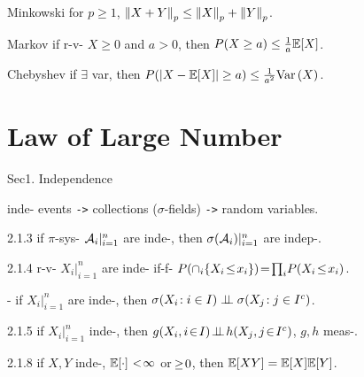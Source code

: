 \begin{thm}{Minkowski}
    for $p \geq 1$, $\norm{p}{X+Y} \leq \norm{p}{X} + \norm{p}{Y}$.
\end{thm}

\begin{thm}{Markov}
    if r-v- $X \geq 0$ and $a > 0$, then $\prob{ X \geq a} \leq \frac{1}{a}\bE{X}$.
\end{thm}

\begin{thm}{Chebyshev}
    if $\exists$ var, then $\prob{\abs{X-\bE{X}} \geq a} \leq \frac{1}{a^2} \var{X}$.
\end{thm}

\newcol

\section*{Law of Large Number}

\vspace{-1em}

Sec1. Independence \hrulefill

\begin{defi}
    inde- events \verb|->| collections ($\sigma$-fields) \verb|->| random variables.
\end{defi}

\begin{thm}{2.1.3}
    if $\pi$-sys- $\cA_i\rvert_{i=1}^n$ are inde-, then $\sigma(\cA_i)\rvert_{i=1}^n$ are indep-.
\end{thm}

\begin{thm}{2.1.4}
    r-v- $X_i\rvert_{i=1}^n$ are inde- if-f- $P(\cap_i \{X_i \!\leq\! x_i\}) \!=\! \prod_i \! P(X_i \tleq x_i)$.
\end{thm}

\begin{thm}{-}
    if $X_i\rvert_{i=1}^n$ are inde-, then $\sigma(X_i\!: i\in I) \indep \sigma(X_j\!: j\in \comp{I})$.
\end{thm}

\begin{thm}{2.1.5}
    if $X_i\rvert_{i=1}^n\!$ inde-, then $g(X_i, i\tin I) \tindep h(X_j, j\tin \comp{I})$, $g, h$ meas-.
\end{thm}

\begin{thm}{2.1.8}
    if $X, Y$ inde-, $\bE{\cdot}$ $\tl \infty$ or $\tgeq 0$, then $\bE{XY} = \bE{X}\bE{Y}$.
\end{thm}

